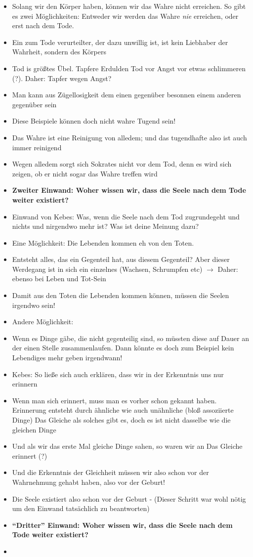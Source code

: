 \documentclass[emulatestandardclasses]{scrartcl}
\begin{document}
\begin{itemize}
  \item Solang wir den Körper haben, können wir das Wahre nicht erreichen. So gibt es zwei Möglichkeiten: Entweder wir werden das Wahre \emph{nie} erreichen, oder erst nach dem Tode.
  \item Ein zum Tode verurteilter, der dazu unwillig ist, ist kein Liebhaber der Wahrheit, sondern des Körpers
  \item Tod is größtes Übel. Tapfere Erdulden Tod vor Angst vor etwas schlimmeren (?). Daher: Tapfer wegen Angst?  
  \item Man kann aus Zügellosigkeit dem einen gegenüber besonnen einem anderen gegenüber sein
  \item Diese Beispiele können doch nicht wahre Tugend sein!
  \item Das Wahre ist eine Reinigung von alledem; und das tugendhafte also ist auch immer reinigend
  \item Wegen alledem sorgt sich Sokrates nicht vor dem Tod, denn es wird sich zeigen, ob er nicht sogar das Wahre treffen wird 
  \item \textbf{Zweiter Einwand: Woher wissen wir, dass die Seele nach dem Tode weiter existiert?}
  \item Einwand von Kebes: Was, wenn die Seele nach dem Tod zugrundegeht und nichts und nirgendwo mehr ist? Was ist deine Meinung dazu?
  \item Eine Möglichkeit: Die Lebenden kommen eh von den Toten.
  \item Entsteht alles, das ein Gegenteil hat, aus diesem Gegenteil? Aber dieser Werdegang ist in sich ein einzelnes (Wachsen, Schrumpfen etc) $\rightarrow$ Daher: ebenso bei Leben und Tot-Sein
  \item Damit aus den Toten die Lebenden kommen können, müssen die Seelen irgendwo sein!
  \item Andere Möglichkeit:
  \item Wenn es Dinge gäbe, die nicht gegenteilig sind, so müssten diese auf Dauer an der einen Stelle zusammenlaufen. Dann könnte es doch zum Beispiel kein Lebendiges mehr geben irgendwann!
  \item Kebes: So ließe sich auch erklären, dass wir in der Erkenntnis uns nur erinnern
  \item Wenn man sich erinnert, muss man es vorher schon gekannt haben. Erinnerung entsteht durch ähnliche wie auch unähnliche (bloß assoziierte Dinge) Das Gleiche als solches gibt es, doch es ist nicht dasselbe wie die gleichen Dinge
  \item Und als wir das erste Mal gleiche Dinge sahen, so waren wir an Das Gleiche erinnert (?)
  \item Und die Erkenntnis der Gleichheit müssen wir also schon vor der Wahrnehmung gehabt haben, also vor der Geburt! 
  \item Die Seele existiert also schon vor der Geburt - (Dieser Schritt war wohl nötig um den Einwand tatsächlich zu beantworten)
  \item \textbf{"`Dritter"' Einwand: Woher wissen wir, dass die Seele nach dem Tode weiter existiert?}
  \item  
\end{itemize}
\end{document}
